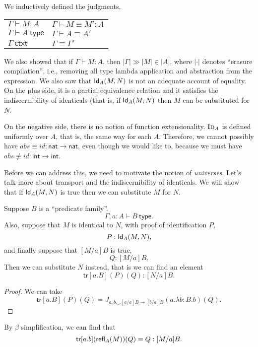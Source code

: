 \documentclass{article} \usepackage{chtt-notes} \usepackage{stmaryrd}
\newcommand{\entails}{\vdash}
\newcommand{\tr}{\textsf{tr}}
\begin{document}
We inductively defined the judgments,
\begin{center}
\begin{tabular}{ll}
  $\Gamma \entails M : A$ &
  $\Gamma \entails M \equiv M' : A$ \\
  $\Gamma \entails A~\textsf{type}$ &
  $\Gamma \entails A \equiv A'$ \\
  $\Gamma~\textsf{ctxt}$ &
  $\Gamma \equiv \Gamma'$
\end{tabular}
\end{center}
We also showed that if $\Gamma \entails M : A$, then $|\Gamma| \gg |M| \in |A|$, where $|\cdot|$ denotes ``erasure compilation'', i.e., removing all type lambda application and abstraction from the expression.
We also saw that $\mathsf{Id}_{A}(M,N)$ is not an adequate account of equality. On the plus side,
it is a partial equivalence relation and it satisfies the indiscernibility of identicals
(that is, if $\mathsf{Id}_{A}(M,N)$ then $M$ can be substituted for $N$.

On the negative side, there is no notion of function extensionality. $\textsc{Id}_A$ is defined
uniformly over $A$, that is, the same way for each $A$. Therefore,
we cannot possibly have
$abs \equiv id : \textsf{nat} \to \textsf{nat}$, even though we would like to,
because we must have
$abs \not\equiv id : \textsf{int} \to \textsf{int}$.

Before we can address this, we need to motivate the notion of \emph{universes}. Let's talk
more about transport and the indiscernibility of identicals. We will show that
if $\mathsf{Id}_{A}(M,N)$ is true then we can substitute $M$ for $N$.

\begin{theorem*}[Transport]
  Suppose $B$ is a ``predicate family''.
  \[ \Gamma, a:A \entails B~\textsf{type}. \]
  Also, suppose that $M$ is identical to $N$, with proof of identification $P$,
  \[ P : \mathsf{Id}_{A}(M,N), \]
  and finally suppose that $[M/a]B$ is true,
  \[ Q : [M/a]B. \]
  Then we can substitute $N$ instead, that is we can find an element
  \[ \tr[a.B](P)(Q) : [N/a]B. \]
\end{theorem*}
\begin{proof}
  We can take
  \[
    \tr[a.B](P)(Q) = J_{a,b,\_. [a/a]B \to [b/a]B}(a.\lambda b:B . b)(Q).
  \]
\end{proof}
\begin{remark}
  By $\beta$ simplification, we can find that
  \[
    \tr[a.b](\refl{A}{M})(Q) \equiv Q : [M/a]B.
  \]
\end{remark}
\end{document}
